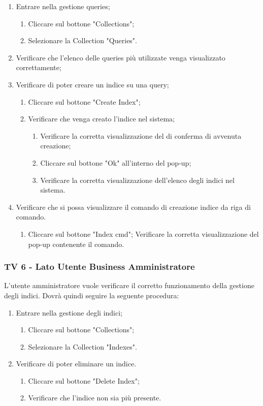 \begin{enumerate}
\item Entrare nella gestione queries;
\begin{enumerate}
\item Cliccare sul bottone "Collections";
\item Selezionare la Collection "Queries".
\end{enumerate}
\item Verificare che l'elenco delle queries più utilizzate venga visualizzato correttamente;
\item Verificare di poter creare un indice su una query;
\begin{enumerate}
\item Cliccare sul bottone "Create Index";
\item Verificare che venga creato l'indice nel sistema;
\begin{enumerate}
\item Verificare la corretta visualizzazione del  di conferma di avvenuta creazione;
\item Cliccare sul bottone "Ok" all'interno del pop-up;
\item Verificare la corretta visualizzazione dell'elenco degli indici nel sistema.
\end{enumerate}
\end{enumerate}
\item Verificare che si possa visualizzare il comando di creazione indice da riga di comando.
\begin{enumerate}
\item Cliccare sul bottone "Index cmd";
Verificare la corretta visualizzazione del pop-up contenente il comando.
\end{enumerate}

\end{enumerate}
\subsubsection{TV 6 - Lato Utente Business Amministratore}

L’utente amministratore vuole verificare il corretto funzionamento della gestione degli indici.
Dovrà quindi seguire la seguente procedura:

\begin{enumerate}
\item Entrare nella gestione degli indici;
\begin{enumerate}
\item Cliccare sul bottone "Collections";
\item Selezionare la Collection "Indexes".
\end{enumerate}
\item Verificare di poter eliminare un indice.
\begin{enumerate}
\item Cliccare sul bottone "Delete Index";
\item Verificare che l'indice non sia più presente.
\end{enumerate}
\end{enumerate}


